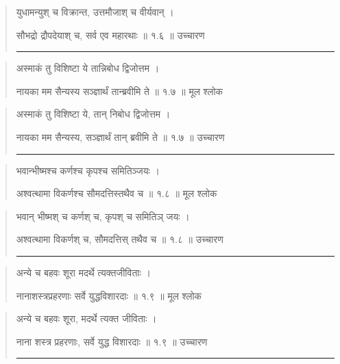 \begin{quotation}

युधामन्युश् च विक्रान्त, उत्तमौजाश् च वीर्यवान्  ।  

सौभद्रो द्रौपदेयाश् च, सर्व एव महारथाः  ॥ १.६ ॥  उच्चारण

\noindent\rule{16cm}{0.4pt} 
\end{quotation}


\begin{quotation} 

अस्माकं तु विशिष्टा ये तान्निबोध द्विजोत्तम  ।  

नायका मम सैन्यस्य सञ्ज्ञार्थं तान्ब्रवीमि ते  ॥ १.७ ॥  मूल श्लोक
\end{quotation}

\begin{quotation}

अस्माकं तु विशिष्टा ये, तान्‌ निबोध द्विजोत्तम  ।  

नायका मम सैन्यस्य, सञ्ज्ञार्थं तान्‌ ब्रवीमि ते  ॥ १.७ ॥  उच्चारण

\noindent\rule{16cm}{0.4pt} 
\end{quotation}


\begin{quotation} 

भवान्भीष्मश्च कर्णश्च कृपश्च समितिञ्जयः  ।  

अश्वत्थामा विकर्णश्च सौमदत्तिस्तथैव च  ॥ १.८ ॥  मूल श्लोक
\end{quotation}

\begin{quotation}

भवान् भीष्मश् च कर्णश् च, कृपश् च समितिञ् जयः ।  

अश्वत्थामा विकर्णश् च, सौमदत्तिस् तथैव च  ॥ १.८ ॥  उच्चारण

\noindent\rule{16cm}{0.4pt} 
\end{quotation}


\begin{quotation} 

अन्ये च बहवः शूरा मदर्थे त्यक्तजीविताः  ।  

नानाशस्त्रप्रहरणाः सर्वे युद्धविशारदाः  ॥ १.९ ॥  मूल श्लोक
\end{quotation}

\begin{quotation}

अन्ये च बहवः शूरा, मदर्थे त्यक्त जीविताः  ।  

नाना शस्त्र प्रहरणाः, सर्वे युद्ध विशारदाः  ॥ १.९ ॥  उच्चारण

\noindent\rule{16cm}{0.4pt} 
\end{quotation}


